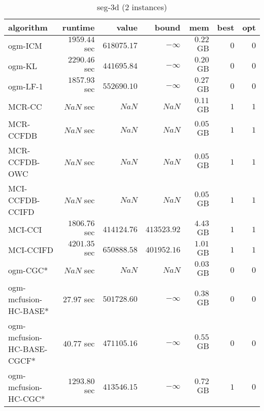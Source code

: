 \begin{table}[H]
\tiny
\centering
\caption{seg-3d (2 instances)}
\label{tab:smalltable-seg-3d}
\begin{tabular}{lrrrrrr}
\toprule
           algorithm &       runtime     &         value &         bound &           mem &     best &      opt   \\ \midrule 
             ogm-ICM & $      1959.44$ sec & $    618075.17$ & $-\infty$ & $         0.22$ GB & $       0$ & $       0$ \\ 
              ogm-KL & $      2290.46$ sec & $    441695.84$ & $-\infty$ & $         0.20$ GB & $       0$ & $       0$ \\ 
            ogm-LF-1 & $      1857.93$ sec & $    552690.10$ & $-\infty$ & $         0.27$ GB & $       0$ & $       0$ \\ 
\cmidrule{1-1} 
              MCR-CC & $          NaN$ sec & $          NaN$ & $          NaN$ & $         0.11$ GB & $       1$ & $       1$ \\ 
           MCR-CCFDB & $          NaN$ sec & $          NaN$ & $          NaN$ & $         0.05$ GB & $       1$ & $       1$ \\ 
       MCR-CCFDB-OWC & $          NaN$ sec & $          NaN$ & $          NaN$ & $         0.05$ GB & $       1$ & $       1$ \\ 
\cmidrule{1-1} 
     MCI-CCFDB-CCIFD & $          NaN$ sec & $          NaN$ & $          NaN$ & $         0.05$ GB & $       1$ & $       1$ \\ 
             MCI-CCI & $      1806.76$ sec & $    414124.76$ & $    413523.92$ & $         4.43$ GB & $       1$ & $       1$ \\ 
           MCI-CCIFD & $      4201.35$ sec & $    650888.58$ & $    401952.16$ & $         1.01$ GB & $       1$ & $       1$ \\ 
\cmidrule{1-1} 
            ogm-CGC* & $          NaN$ sec & $          NaN$ & $          NaN$ & $         0.03$ GB & $       0$ & $       0$ \\ 
ogm-mcfusion-HC-BASE* & $        27.97$ sec & $    501728.60$ & $-\infty$ & $         0.38$ GB & $       0$ & $       0$ \\ 
ogm-mcfusion-HC-BASE-CGCF* & $        40.77$ sec & $    471105.16$ & $-\infty$ & $         0.55$ GB & $       0$ & $       0$ \\ 
ogm-mcfusion-HC-CGC* & $      1293.80$ sec & $    413546.15$ & $-\infty$ & $         0.72$ GB & $       1$ & $       0$ \\ 

\end{tabular}
\end{table}
